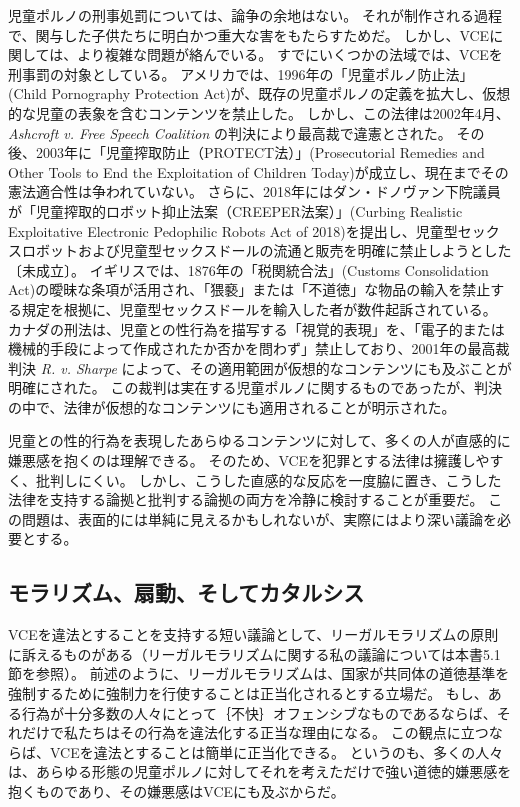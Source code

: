 \documentclass[paper=a4,book,openany]{jlreq}
\begin{document}
児童ポルノの刑事処罰については、論争の余地はない。
それが制作される過程で、関与した子供たちに明白かつ重大な害をもたらすためだ。
しかし、VCEに関しては、より複雑な問題が絡んでいる。
すでにいくつかの法域では、VCEを刑事罰の対象としている。
アメリカでは、1996年の「児童ポルノ防止法」(Child Pornography Protection Act)が、既存の児童ポルノの定義を拡大し、仮想的な児童の表象を含むコンテンツを禁止した。
しかし、この法律は2002年4月、\emph{Ashcroft v. Free Speech Coalition} の判決により最高裁で違憲とされた。
その後、2003年に「児童搾取防止（PROTECT法）」(Prosecutorial Remedies and Other Tools to End the Exploitation of Children Today)が成立し、現在までその憲法適合性は争われていない。
さらに、2018年にはダン・ドノヴァン下院議員が「児童搾取的ロボット抑止法案（CREEPER法案）」(Curbing Realistic Exploitative Electronic Pedophilic Robots Act of 2018)を提出し、児童型セックスロボットおよび児童型セックスドールの流通と販売を明確に禁止しようとした〔未成立〕。
イギリスでは、1876年の「税関統合法」(Customs Consolidation Act)の曖昧な条項が活用され、「猥褻」または「不道徳」な物品の輸入を禁止する規定を根拠に、児童型セックスドールを輸入した者が数件起訴されている。
カナダの刑法は、児童との性行為を描写する「視覚的表現」を、「電子的または機械的手段によって作成されたか否かを問わず」禁止しており、2001年の最高裁判決 \emph{R. v. Sharpe} によって、その適用範囲が仮想的なコンテンツにも及ぶことが明確にされた。
この裁判は実在する児童ポルノに関するものであったが、判決の中で、法律が仮想的なコンテンツにも適用されることが明示された。

児童との性的行為を表現したあらゆるコンテンツに対して、多くの人が直感的に嫌悪感を抱くのは理解できる。
そのため、VCEを犯罪とする法律は擁護しやすく、批判しにくい。
しかし、こうした直感的な反応を一度脇に置き、こうした法律を支持する論拠と批判する論拠の両方を冷静に検討することが重要だ。
この問題は、表面的には単純に見えるかもしれないが、実際にはより深い議論を必要とする。

\subsection{モラリズム、扇動、そしてカタルシス}

VCEを違法とすることを支持する短い議論として、リーガルモラリズムの原則に訴えるものがある（リーガルモラリズムに関する私の議論については本書5.1節を参照）。
前述のように、リーガルモラリズムは、国家が共同体の道徳基準を強制するために強制力を行使することは正当化されるとする立場だ。
もし、ある行為が十分多数の人々にとって｛不快｝{オフェンシブ}なものであるならば、それだけで私たちはその行為を違法化する正当な理由になる。
この観点に立つならば、VCEを違法とすることは簡単に正当化できる。
というのも、多くの人々は、あらゆる形態の児童ポルノに対してそれを考えただけで強い道徳的嫌悪感を抱くものであり、その嫌悪感はVCEにも及ぶからだ。
\end{document}
